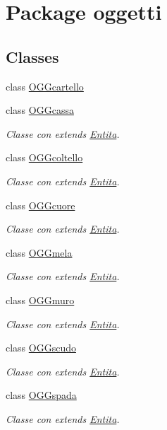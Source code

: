 \hypertarget{namespaceoggetti}{}\section{Package oggetti}
\label{namespaceoggetti}
\subsection*{Classes}
\begin{DoxyCompactItemize}
\item 
class \hyperlink{classoggetti_1_1_o_g_gcartello}{O\+G\+Gcartello}
\item 
class \hyperlink{classoggetti_1_1_o_g_gcassa}{O\+G\+Gcassa}
\begin{DoxyCompactList}\small\item\em Classe con extends \hyperlink{namespace_entita}{Entita}. \end{DoxyCompactList}\item 
class \hyperlink{classoggetti_1_1_o_g_gcoltello}{O\+G\+Gcoltello}
\begin{DoxyCompactList}\small\item\em Classe con extends \hyperlink{namespace_entita}{Entita}. \end{DoxyCompactList}\item 
class \hyperlink{classoggetti_1_1_o_g_gcuore}{O\+G\+Gcuore}
\begin{DoxyCompactList}\small\item\em Classe con extends \hyperlink{namespace_entita}{Entita}. \end{DoxyCompactList}\item 
class \hyperlink{classoggetti_1_1_o_g_gmela}{O\+G\+Gmela}
\begin{DoxyCompactList}\small\item\em Classe con extends \hyperlink{namespace_entita}{Entita}. \end{DoxyCompactList}\item 
class \hyperlink{classoggetti_1_1_o_g_gmuro}{O\+G\+Gmuro}
\begin{DoxyCompactList}\small\item\em Classe con extends \hyperlink{namespace_entita}{Entita}. \end{DoxyCompactList}\item 
class \hyperlink{classoggetti_1_1_o_g_gscudo}{O\+G\+Gscudo}
\begin{DoxyCompactList}\small\item\em Classe con extends \hyperlink{namespace_entita}{Entita}. \end{DoxyCompactList}\item 
class \hyperlink{classoggetti_1_1_o_g_gspada}{O\+G\+Gspada}
\begin{DoxyCompactList}\small\item\em Classe con extends \hyperlink{namespace_entita}{Entita}. \end{DoxyCompactList}\end{DoxyCompactItemize}
